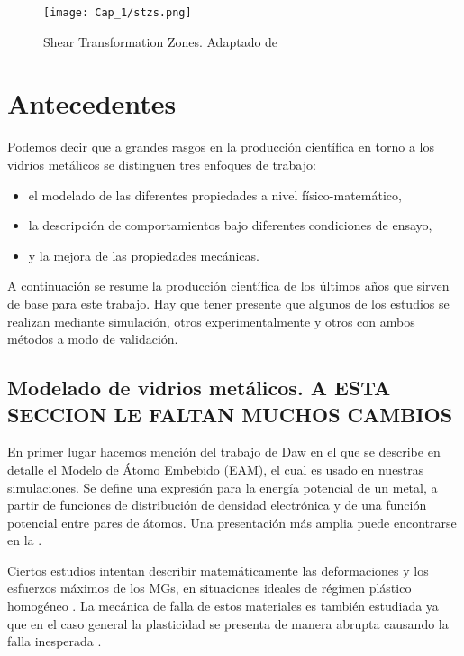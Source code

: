 \begin{figure}[H]
 \centering
 \texttt{[image: Cap\_1/stzs.png]}
 \caption[Shear Transformation Zones]{Shear Transformation Zones. Adaptado de \cite{albe13}}
 \label{C1:fg:stzs}
\end{figure}


\section{Antecedentes}
\label{S1_2}

Podemos decir que a grandes rasgos en la producción científica en torno a los vidrios metálicos se distinguen tres enfoques de trabajo:

\begin{itemize}
 \item el modelado de las diferentes propiedades a nivel físico-matemático,
 \item la descripción de comportamientos bajo diferentes condiciones de ensayo,
 \item y la mejora de las propiedades mecánicas.
\end{itemize}

A continuación se resume la producción científica de los últimos años que sirven de base para este trabajo. Hay que tener presente que algunos de los estudios se realizan mediante simulación, otros experimentalmente y otros con ambos métodos a modo de validación.

\subsection{Modelado de vidrios metálicos. A ESTA SECCION LE FALTAN MUCHOS CAMBIOS}
En primer lugar hacemos mención del trabajo de Daw \citep{daw84} en el que se describe en detalle el Modelo de Átomo Embebido (EAM), el cual es usado en nuestras simulaciones. Se define una expresión para la energía potencial de un metal, a partir de funciones de distribución de densidad electrónica y de una función potencial entre pares de átomos. Una presentación más amplia puede encontrarse en la .

Ciertos estudios intentan describir matemáticamente las deformaciones y los esfuerzos máximos de los MGs, en situaciones ideales de régimen plástico homogéneo \citep{Wisitsorasak12, cheng11}. La mecánica de falla de estos materiales es también estudiada ya que en el caso general la plasticidad se presenta de manera abrupta causando la falla inesperada \citep{Chen11, Egami11}.

